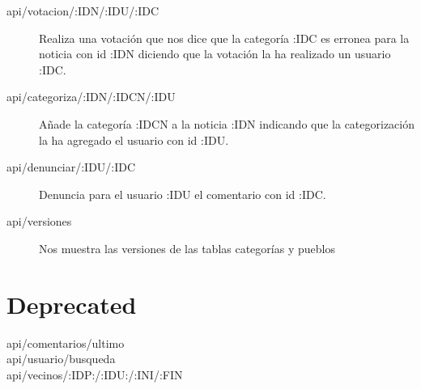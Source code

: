 \begin{description}
\item[api/votacion/:IDN/:IDU/:IDC]
Realiza una votación que nos dice que la categoría :IDC es erronea para la noticia con id :IDN diciendo que la votación la ha realizado un usuario :IDC.

\item[api/categoriza/:IDN/:IDCN/:IDU]
Añade la categoría :IDCN a la noticia :IDN indicando que la categorización la ha agregado el usuario con id :IDU.

\item[api/denunciar/:IDU/:IDC]
Denuncia para el usuario :IDU el comentario con id :IDC.

\item[api/versiones]
Nos muestra las versiones de las tablas categorías y pueblos

\end{description}


\section{Deprecated}
\begin{description}
\item[api/comentarios/ultimo]
\item[api/usuario/busqueda]
\item[api/vecinos/:IDP:/:IDU:/:INI/:FIN]
\end{description}
